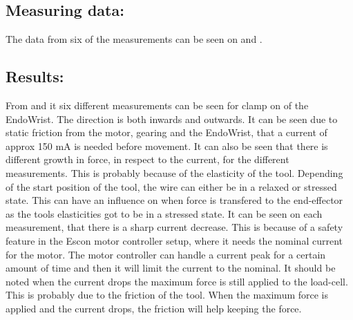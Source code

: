 \subsection*{Measuring data:}
The data from six of the measurements can be seen on  and .








\subsection*{Results:}
From  and  it six different measurements can be seen for clamp on of the EndoWrist. The direction is both inwards and outwards. It can be seen due to static friction from the motor, gearing and the EndoWrist, that a current of approx 150 mA is needed before movement. It can also be seen that there is different growth in force, in respect to the current, for the different measurements. This is probably because of the elasticity of the tool. Depending of the start position of the tool, the wire can either be in a relaxed or stressed state. This can have an influence on when force is transfered to the end-effector as the tools elasticities got to be in a stressed state. It can be seen on each measurement, that there is a sharp current decrease. This is because of a safety feature in the Escon motor controller setup, where it needs the nominal current for the motor. The motor controller can handle a current peak for a certain amount of time and then it will limit the current to the nominal. It should be noted when the current drops the maximum force is still applied to the load-cell. This is probably due to the friction of the tool. When the maximum force is applied and the current drops, the friction will help keeping the force.



